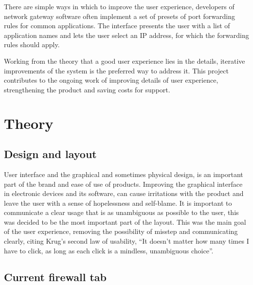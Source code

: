 \documentclass[a4paper,11pt,makeidx]{kth-bcs}
\begin{document}
There are simple ways in which to improve the user experience, developers of network gateway software often implement a set of presets of port forwarding rules for common applications.
The interface presents the user with a list of application names and lets the user select an IP address, for which the forwarding rules should apply.

Working from the theory that a good user experience lies in the details, iterative improvements of the system is the preferred way to address it.
This project contributes to the ongoing work of improving details of user experience, strengthening the product and saving costs for support.

\chapter{Theory}

\section{Design and layout}
User interface and the graphical and sometimes physical design, is an important part of the brand and ease of use of products.
Improving the graphical interface in electronic devices and its software, can cause irritations with the product and leave the user with a sense of hopelessness and self-blame.\cite[p.~34]{norman2002design}
It is important to communicate a clear usage that is as unambiguous as possible to the user, this was decided to be the most important part of the layout.
This was the main goal of the user experience, removing the possibility of misstep and communicating clearly, citing Krug's second law of usability\cite[p.~41]{krug2006don}, ``It doesn’t matter how many times I have to click, as long as each click is a mindless, unambiguous choice''.

\section{Current firewall tab}
\end{document}
